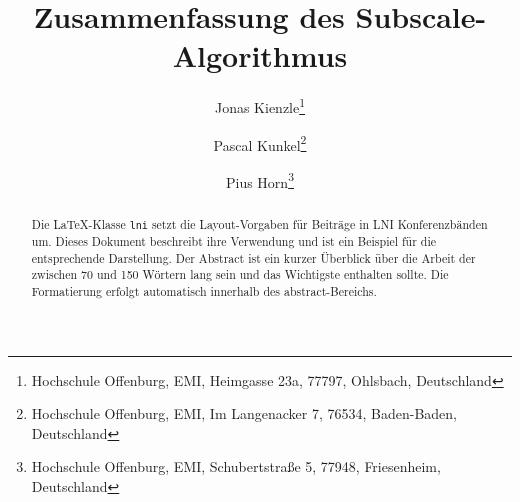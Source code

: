\documentclass[utf8,biblatex]{lni}
\begin{document}
\title[Subscale]{Zusammenfassung des Subscale-Algorithmus}
\author[Jonas Kienzle, Pascal Kunkel \and Pius Horn]
{Jonas Kienzle\footnote{Hochschule Offenburg, EMI, Heimgasse 23a, 77797, Ohlsbach, Deutschland } \and
 Pascal Kunkel\footnote{Hochschule Offenburg, EMI, Im Langenacker 7, 76534, Baden-Baden, Deutschland } \and
Pius Horn\footnote{Hochschule Offenburg, EMI, Schubertstraße 5, 77948, Friesenheim, Deutschland }}
\maketitle

\begin{abstract}
Die \LaTeX-Klasse \texttt{lni} setzt die Layout-Vorgaben für Beiträge in LNI Konferenzbänden um.
Dieses Dokument beschreibt ihre Verwendung und ist ein Beispiel für die entsprechende Darstellung.
Der Abstract ist ein kurzer Überblick über die Arbeit der zwischen 70 und 150 Wörtern lang sein und das Wichtigste enthalten sollte.
Die Formatierung erfolgt automatisch innerhalb des abstract-Bereichs.
\end{abstract}

\end{document}
